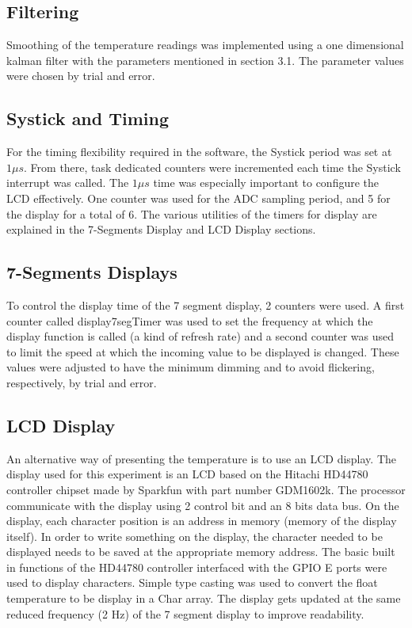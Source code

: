 \documentclass[12pt]{article}
\begin{document}
\subsection{Filtering}
Smoothing of the temperature readings was implemented using a one dimensional kalman filter with the parameters mentioned in section 3.1. The parameter values were chosen by trial and error.

\subsection{Systick and Timing}
For the timing flexibility required in the software, the Systick period was set at $1\mu s$. From there, task dedicated counters were incremented each time the Systick interrupt was called. The $1\mu s$ time was especially important to configure the LCD effectively. One counter was used for the ADC sampling period, and 5 for the display for a total of 6. The various utilities of the timers for display are explained in the 7-Segments Display and LCD Display sections.
\subsection{7-Segments Displays}

To control the display time of the 7 segment display, 2 counters were used. A first counter called display7segTimer was used to set the frequency at which the display function is called (a kind of refresh rate) and a second counter was used to limit the speed at which the incoming value to be displayed is changed. These values were adjusted to have the minimum dimming and to avoid flickering, respectively, by trial and error. 

\subsection{LCD Display}
An alternative way of presenting the temperature is to use an LCD display. The display used for this experiment is an LCD based on  the  Hitachi  HD44780  controller  chipset made by Sparkfun with part number GDM1602k. The processor communicate with the display using 2 control bit and an 8 bits data bus. On the display, each character position is an address in memory (memory of the display itself). In order to write something on the display, the character needed to be displayed needs to be saved at the appropriate memory address. The basic built in functions of the HD44780 controller interfaced with the GPIO E ports were used to display characters. Simple type casting was used to convert the float temperature to be display in a Char array. The display gets updated at the same reduced frequency (2 Hz) of the 7 segment display to improve readability. 
\end{document}
